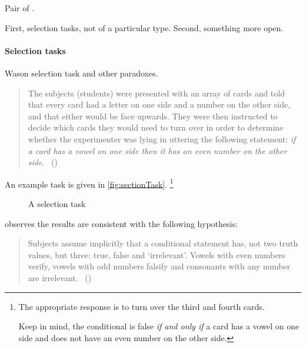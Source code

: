 \begin{note}
  Pair of .

  First, selection tasks, not \tC{} of a particular type.
  Second, something more open.
\end{note}

\paragraph*{Selection tasks}
\nocite{Wason:1968aa}
\nocite{Wason:1971aa}

\begin{note}
  Wason selection task and other paradoxes.

  \begin{quote}
    The subjects (students) were presented with an array of cards and told that every card had a letter on one side and a number on the other side, and that either would be face upwards.
    They were then instructed to decide which cards they would need to turn over in order to determine whether the experimenter was lying in uttering the following statement:
    \emph{if a card has a vowel on one side then it has an even number on the other side}.%
    \mbox{ }\hfill\mbox{(\citeyear[145--146]{Wason:1966aa})}
  \end{quote}

  An example task is given in \autoref{fig:sectionTask}.%
  \footnote{
    The appropriate response is to turn over the third and fourth cards.

    Keep in mind, the conditional is false \emph{if and only if} a card has a vowel on one side and does not have an even number on the other side.
  }

  \begin{figure}[H]
    \centering
    \caption{A selection task}
    \label{fig:sectionTask}
  \end{figure}

  \citeauthor{Wason:1966aa} observes the results are consistent with the following hypothesis:
  \begin{quote}
    Subjects assume implicitly that a conditional statement has, not two truth values, but three: true, false and `irrelevant'.
    Vowels with even numbers verify, vowels with odd numbers falsify and consonants with any number are irrelevant.%
    \mbox{ }\hfill\mbox{(\citeyear[146]{Wason:1966aa})}
  \end{quote}


\end{note}
